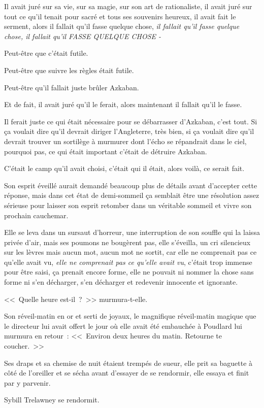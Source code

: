 Il avait juré sur sa vie, sur sa magie, sur son art de rationaliste, il avait juré sur tout ce qu'il tenait pour sacré et tous ses souvenirs heureux, il avait fait le serment, alors il fallait qu'il fasse quelque chose, \emph{il fallait qu'il fasse quelque chose, il fallait qu'il FASSE QUELQUE CHOSE -}

Peut-être que c'était futile.

Peut-être que suivre les règles était futile.

Peut-être qu'il fallait juste brûler Azkaban.

Et de fait, il avait juré qu'il le ferait, alors maintenant il fallait qu'il le fasse.

Il ferait juste ce qui était nécessaire pour se débarrasser d'Azkaban, c'est tout. Si ça voulait dire qu'il devrait diriger l'Angleterre, très bien, si ça voulait dire qu'il devrait trouver un sortilège à murmurer dont l'écho se répandrait dans le ciel, pourquoi pas, ce qui était important c'était de détruire Azkaban.

C'était le camp qu'il avait choisi, c'était qui il était, alors voilà, ce serait fait.

Son esprit éveillé aurait demandé beaucoup plus de détails avant d'accepter cette réponse, mais dans cet état de demi-sommeil ça semblait être une résolution assez sérieuse pour laisser son esprit retomber dans un véritable sommeil et vivre son prochain cauchemar.


Elle se leva dans un sursaut d'horreur, une interruption de son souffle qui la laissa privée d'air, mais ses poumons ne bougèrent pas, elle s'éveilla, un cri silencieux sur les lèvres mais aucun mot, aucun mot ne sortit, car elle ne comprenait pas ce qu'elle avait vu, \emph{elle ne comprenait pas ce qu'elle avait vu}, c'était trop immense pour être saisi, ça prenait encore forme, elle ne pouvait ni nommer la chose sans forme ni s'en décharger, s'en décharger et redevenir innocente et ignorante.

<<~Quelle heure est-il~?~>> murmura-t-elle.

Son réveil-matin en or et serti de joyaux, le magnifique réveil-matin magique que le directeur lui avait offert le jour où elle avait été embauchée à Poudlard lui murmura en retour~: <<~Environ deux heures du matin. Retourne te coucher.~>>

Ses draps et sa chemise de nuit étaient trempés de sueur, elle prit sa baguette à côté de l'oreiller et se sécha avant d'essayer de se rendormir, elle essaya et finit par y parvenir.

Sybill Trelawney se rendormit. 

